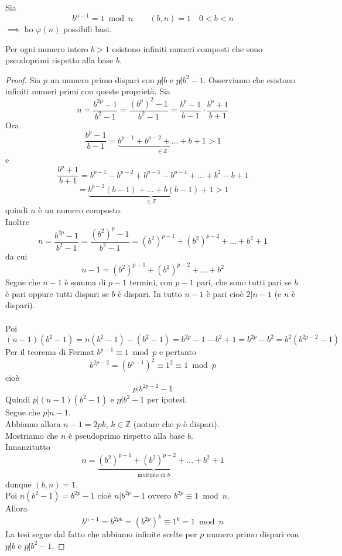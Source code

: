 \documentclass[a4paper,12pt, oneside]{book}
\begin{document}
				\begin{osservazione}
					Sia
					$$b^{n-1} = 1 \bmod n \qquad (b,n)=1 \quad 0<b<n$$
					$\implies$ ho $\varphi(n)$ possibili basi.
				\end{osservazione}
				
				\begin{teorema}
					Per ogni numero intero $b>1$ esistono infiniti numeri composti che sono pseudoprimi rispetto alla base $b$.
					
					\begin{proof}
						Sia $p$ un numero primo dispari con $p \not| b$ e $p \not|  b^2-1$. Osserviamo che esistono infiniti numeri primi con queste proprietà.
						Sia\\
						$$n=\frac{ b^{2p} -1 }{b^2 -1} = \frac{ (b^{p})^2 -1 }{b^2 -1} = \frac{b^p - 1}{b-1} \cdot \frac{b^p + 1}{b+1}$$
						Ora
						$$\frac{b^p-1}{b-1} = \underbrace{b^{p-1} + b^{p-2} + \dots + b+1}_{\in \mathbb{Z}} > 1$$
						e
						$$\frac{b^p+1}{b+1} = b^{p-1} - b^{p-2} + b^{p-3} - b^{p-4} + \dots + b^2 -b+1$$
						$$ = \underbrace{b^{p-2}(b-1) + \dots + b(b-1) +1}_{\in \mathbb{Z}} > 1$$
						quindi $n$ è un numero composto.\\
						Inoltre
						$$n=\frac{ b^{2p} -1 }{b^2 -1} = \frac{ (b^{2})^p -1 }{b^2 -1} = (b^2)^{p-1}  + (b^2)^{p-2} + \dots + b^2 +1$$
						da cui
						$$n-1 = (b^2)^{p-1}  + (b^2)^{p-2} + \dots + b^2$$
						Segue che $n-1$ è somma di $p-1$ termini, con $p-1$ pari, che sono tutti pari se $b$ è pari oppure tutti dispari se $b$ è dispari.
						In tutto $n-1$ è pari cioè $2|n-1$ (e $n$ è dispari).\\\\
						Poi
						$$(n-1)(b^2-1) = n(b^2-1) - (b^2-1) = b^{2p} -1-b^2+1=b^{2p} -b^2 = b^2(b^{2p-2} -1)$$
						Per il teorema di Fermat $b^{p-1} \equiv 1 \bmod p$ e pertanto
						$$b^{2p-2} = (b^{p-1})^2 \equiv 1^2 \equiv 1 \bmod p$$
						cioè $$p|b^{2p-2}-1$$
						Quindi $p|(n-1)(b^2 -1)$ e $p \not | b^2 -1$ per ipotesi.\\
						Segue che $p|n-1$.\\
						Abbiamo allora $n-1 = 2pk$, $k \in \mathbb{Z}$ (notare che $p$ è dispari).\\
						Mostriamo che $n$ è pseudoprimo rispetto alla base $b$.\\
						Innanzitutto
						$$n=\underbrace{(b^2)^{p-1} + (b^2)^{p-2}+\dots+b^2}_{\mbox{multiplo di }b}+1$$
						dunque $(b,n)=1$.\\
						Poi $n(b^2-1) = b^{2p}-1$ cioè $n|b^{2p}-1$ ovvero $b^{2p} \equiv 1 \bmod n$.\\
						Allora 
						$$b^{n-1} = b^{2pk} = (b^{2p})^k \equiv 1^k = 1 \bmod n$$
						La tesi segue dal fatto che abbiamo infinite scelte per $p$ numero primo dispari con $p \not | b$ e $p \not | b^2 -1$.
							
						
					\end{proof}
				\end{teorema}
				
\end{document}
